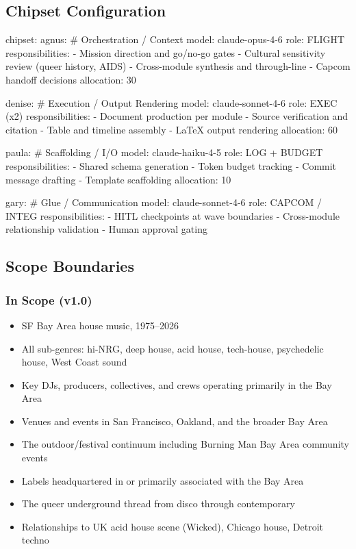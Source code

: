 \documentclass[11pt,letterpaper]{article}
\begin{document}
\subsection{Chipset Configuration}

\begin{asciibox}
chipset:
  agnus:                          # Orchestration / Context
    model: claude-opus-4-6
    role: FLIGHT
    responsibilities:
      - Mission direction and go/no-go gates
      - Cultural sensitivity review (queer history, AIDS)
      - Cross-module synthesis and through-line
      - Capcom handoff decisions
    allocation: 30%

  denise:                         # Execution / Output Rendering
    model: claude-sonnet-4-6
    role: EXEC (x2)
    responsibilities:
      - Document production per module
      - Source verification and citation
      - Table and timeline assembly
      - LaTeX output rendering
    allocation: 60%

  paula:                          # Scaffolding / I/O
    model: claude-haiku-4-5
    role: LOG + BUDGET
    responsibilities:
      - Shared schema generation
      - Token budget tracking
      - Commit message drafting
      - Template scaffolding
    allocation: 10%

  gary:                           # Glue / Communication
    model: claude-sonnet-4-6
    role: CAPCOM / INTEG
    responsibilities:
      - HITL checkpoints at wave boundaries
      - Cross-module relationship validation
      - Human approval gating
\end{asciibox}

\subsection{Scope Boundaries}

\subsubsection{In Scope (v1.0)}
\begin{itemize}[leftmargin=1.5em]
  \item SF Bay Area house music, 1975--2026
  \item All sub-genres: hi-NRG, deep house, acid house, tech-house, psychedelic house, West Coast sound
  \item Key DJs, producers, collectives, and crews operating primarily in the Bay Area
  \item Venues and events in San Francisco, Oakland, and the broader Bay Area
  \item The outdoor/festival continuum including Burning Man Bay Area community events
  \item Labels headquartered in or primarily associated with the Bay Area
  \item The queer underground thread from disco through contemporary
  \item Relationships to UK acid house scene (Wicked), Chicago house, Detroit techno
\end{itemize}
\end{document}
